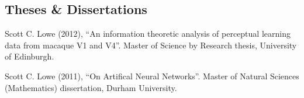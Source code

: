 \documentclass[11pt, a4paper]{article} %
\renewenvironment{itemize}{
  \begin{list}{}{
    \setlength{\leftmargin}{0em}
  }
}{
  \end{list}
}
\begin{document}
\subsection*{Theses \& Dissertations}
%
\begin{itemize}
%
\item
Scott C. Lowe (2012), ``An information theoretic analysis of perceptual learning data from macaque V1 and V4''.
Master of Science by Research thesis, University of Edinburgh.
%
\item
Scott C. Lowe (2011), ``On Artifical Neural Networks''.
Master of Natural Sciences (Mathematics) dissertation, Durham University.
%
\end{itemize}
%
%
%
%
%
%
%
%
%
%
%
%
%
%
%
%
%
%
%
\end{document}
